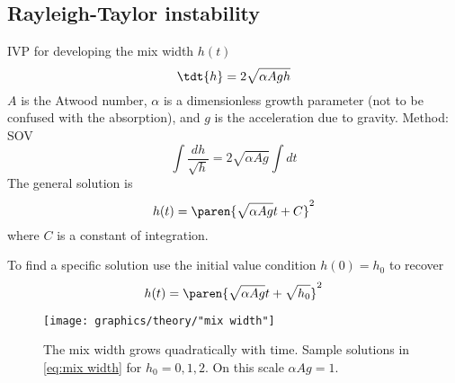\subsection{\label{sec:Radiation hydrodynamics}Rayleigh-Taylor instability}

IVP for developing the mix width $h(t)$
  \begin{equation}
    \tdt{h} = 2 \sqrt{\alpha A g h}
  \end{equation}
$A$ is the Atwood number, $\alpha$ is a dimensionless growth parameter (not to be confused with the absorption), and $g$ is the acceleration due to gravity.
Method: SOV
  \begin{equation}
    \int \frac{dh}{\sqrt{h}} = 2 \sqrt{\alpha A g}\int dt
  \end{equation}
The general solution is
  \begin{equation}
    h(t) = \paren{\sqrt{\alpha A g}t + C}^{2}
  \end{equation}
where $C$ is a constant of integration.

To find a specific solution use the initial value condition $h(0) = h_{0}$ to recover
  \begin{equation}
    h(t) = \paren{\sqrt{\alpha A g}t + \sqrt{h_{0}}}^{2}
  \label{eq:mix width}
  \end{equation}
  
\begin{figure}[htbp] 
   \centering
   \texttt{[image: graphics/theory/"mix width"]} 
   \caption[Parabolic growth of mix width]{The mix width grows quadratically with time. Sample solutions in \eqref{eq:mix width} for $h_{0} = 0, 1, 2$. On this scale $\alpha A g = 1$.}
   \label{fig:example}
\end{figure}

\endinput %